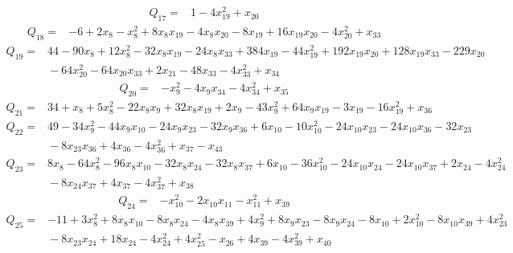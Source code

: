 {\begin{align*}
 Q_{17}={}&1 -4x_{19}^{2} +x_{20}
\end{align*}
\begin{align*}
 Q_{18}={}&-6 +2x_{8} -x_{8}^{2} +8x_{8}x_{19} -4x_{8}x_{20} -8x_{19} +16x_{19}x_{20} -4x_{20}^{2} +x_{33}
\end{align*}
\begin{align*}
 Q_{19}={}&44 -90x_{8} +12x_{8}^{2} -32x_{8}x_{19} -24x_{8}x_{33} +384x_{19} -44x_{19}^{2} +192x_{19}x_{20} +128x_{19}x_{33} -229x_{20}\\
 &{}-64x_{20}^{2} -64x_{20}x_{33} +2x_{21} -48x_{33} -4x_{33}^{2} +x_{34}
\end{align*}
\begin{align*}
 Q_{20}={}&-x_{9}^{2} -4x_{9}x_{34} -4x_{34}^{2} +x_{35}
\end{align*}
\begin{align*}
 Q_{21}={}&34 +x_{8} +5x_{8}^{2} -22x_{8}x_{9} +32x_{8}x_{19} +2x_{9} -43x_{9}^{2} +64x_{9}x_{19} -3x_{19} -16x_{19}^{2} +x_{36}
\end{align*}
\begin{align*}
 Q_{22}={}&49 -34x_{9}^{2} -44x_{9}x_{10} -24x_{9}x_{23} -32x_{9}x_{36} +6x_{10} -10x_{10}^{2} -24x_{10}x_{23} -24x_{10}x_{36} -32x_{23}\\
 &{}-8x_{23}x_{36} +4x_{36} -4x_{36}^{2} +x_{37} -x_{43}
\end{align*}
\begin{align*}
 Q_{23}={}&8x_{8} -64x_{8}^{2} -96x_{8}x_{10} -32x_{8}x_{24} -32x_{8}x_{37} +6x_{10} -36x_{10}^{2} -24x_{10}x_{24} -24x_{10}x_{37} +2x_{24} -4x_{24}^{2}\\
 &{}-8x_{24}x_{37} +4x_{37} -4x_{37}^{2} +x_{38}
\end{align*}
\begin{align*}
 Q_{24}={}&-x_{10}^{2} -2x_{10}x_{11} -x_{11}^{2} +x_{39}
\end{align*}
\begin{align*}
 Q_{25}={}&-11 +3x_{8}^{2} +8x_{8}x_{10} -8x_{8}x_{24} -4x_{8}x_{39} +4x_{9}^{2} +8x_{9}x_{23} -8x_{9}x_{24} -8x_{10} +2x_{10}^{2} -8x_{10}x_{39} +4x_{23}^{2}\\
 &{}-8x_{23}x_{24} +18x_{24} -4x_{24}^{2} +4x_{25}^{2} -x_{26} +4x_{39} -4x_{39}^{2} +x_{40}
\end{align*}
}
